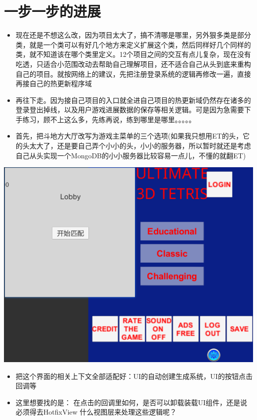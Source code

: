 \documentclass[9pt, b5paper]{article}
\begin{document}
\section{一步一步的进展　}
\label{sec-4}
\begin{itemize}
\item 现在还是不想这么改，因为项目太大了，搞不清哪是哪里，另外狠多类是部分类，就是一个类可以有好几个地方来定义扩展这个类，然后同样好几个同样的类，就不知道该在哪个类里定义。12个项目之间的交互有点儿复杂，现在没有吃透，只适合小范围改动去帮助自己理解项目，还不适合自己从头到底来重构自己的项目。就按网络上的建议，先把注册登录系统的逻辑再修改一遍，直接再接自己的热更新程序域
\item 再往下走。因为接自己项目的入口就全进自己项目的热更新域仍然存在诸多的登录登出掉线，以及用户游戏进展数据的保存等相关逻辑。可是因为急需要下手练习，顾不上这么多，先练再说，练到哪里是哪里。。。。。
\item 首先，把斗地方大厅改写为游戏主菜单的三个选项(如果我只想用ET的头，它的头太大了，还是要自己弄个小小的头，小小的服务器，所以暂时就还是考虑自己从头实现一个MongoDB的小小服务器比较容易一点儿，不懂的就翻ET)
\end{itemize}

\includegraphics[width=.9\linewidth]{./pic/readme_20230201_202642.png}
\begin{itemize}
\item 把这个界面的相关上下文全部适配好：UI的自动创建生成系统，UI的按钮点击回调等
\item 这里想要找的是： 在点击的回调里如何，是否可以卸载装载UI组件，还是说必须得去HotfixView 什么视图层来处理这些逻辑呢？
\end{itemize}
\end{document}

